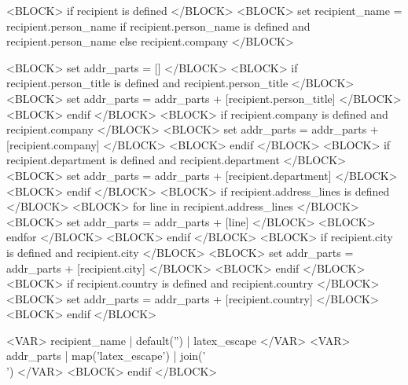
<BLOCK> if recipient is defined </BLOCK>
<BLOCK> set recipient_name = recipient.person_name if recipient.person_name is defined and recipient.person_name else recipient.company </BLOCK>

<BLOCK> set addr_parts = [] </BLOCK>
<BLOCK> if recipient.person_title is defined and recipient.person_title </BLOCK>
<BLOCK> set addr_parts = addr_parts + [recipient.person_title] </BLOCK>
<BLOCK> endif </BLOCK>
<BLOCK> if recipient.company is defined and recipient.company </BLOCK>
<BLOCK> set addr_parts = addr_parts + [recipient.company] </BLOCK>
<BLOCK> endif </BLOCK>
<BLOCK> if recipient.department is defined and recipient.department </BLOCK>
<BLOCK> set addr_parts = addr_parts + [recipient.department] </BLOCK>
<BLOCK> endif </BLOCK>
<BLOCK> if recipient.address_lines is defined </BLOCK>
<BLOCK> for line in recipient.address_lines </BLOCK>
<BLOCK> set addr_parts = addr_parts + [line] </BLOCK>
<BLOCK> endfor </BLOCK>
<BLOCK> endif </BLOCK>
<BLOCK> if recipient.city is defined and recipient.city </BLOCK>
<BLOCK> set addr_parts = addr_parts + [recipient.city] </BLOCK>
<BLOCK> endif </BLOCK>
<BLOCK> if recipient.country is defined and recipient.country </BLOCK>
<BLOCK> set addr_parts = addr_parts + [recipient.country] </BLOCK>
<BLOCK> endif </BLOCK>

\recipient
  {<VAR> recipient_name | default('') | latex_escape </VAR>}
  {<VAR> addr_parts | map('latex_escape') | join('\\') </VAR>}
<BLOCK> endif </BLOCK>
